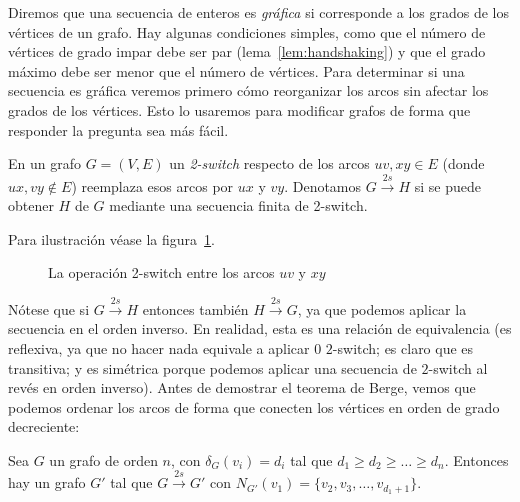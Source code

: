  Diremos que una secuencia de enteros es \emph{gráfica}%
  si corresponde a los grados de los vértices de un grafo.
  Hay algunas condiciones simples,
  como que el número de vértices de grado impar debe ser par
  (lema~\ref{lem:handshaking})
  y que el grado máximo debe ser menor que el número de vértices.
  Para determinar si una secuencia es gráfica
  veremos primero cómo reorganizar los arcos
  sin afectar los grados de los vértices.
  Esto lo usaremos para modificar grafos
  de forma que responder la pregunta sea más fácil.
  \begin{definition}
    En un grafo \(G = (V, E)\)
    un \emph{2\nobreakdash-switch}
    respecto de los arcos \(u v, x y \in E\)
    (donde \(u x, v y \notin E\))
    reemplaza esos arcos por \(u x\) y \(v y\).
    Denotamos \(G \stackrel{2s}{\longrightarrow} H\)
    si se puede obtener \(H\) de \(G\)
    mediante una secuencia finita de 2\nobreakdash-switch.
  \end{definition}
  Para ilustración véase la figura~\ref{fig:2-switch}.
  \begin{figure}[htbp]
    \centering
    \hspace{4em}%
    \caption{La operación 2-switch entre los arcos $u v$ y $x y$}
    \label{fig:2-switch}
  \end{figure}
  Nótese que si \(G \stackrel{2s}{\longrightarrow} H\)
  entonces también \(H \stackrel{2s}{\longrightarrow} G\),
  ya que podemos aplicar la secuencia en el orden inverso.
  En realidad,
  esta es una relación de equivalencia%
  (es reflexiva,
     ya que no hacer nada
     equivale a aplicar \(0\) \(2\)\nobreakdash-switch;
   es claro que es transitiva;
   y es simétrica
     porque podemos aplicar
     una secuencia de \(2\)\nobreakdash-switch
   al revés en orden inverso).
  Antes de demostrar el teorema de Berge,
  vemos que podemos ordenar los arcos
  de forma que conecten los vértices en orden de grado decreciente:
  \begin{lemma}
    \label{lem:Berge}
    Sea \(G\) un grafo de orden \(n\),
    con \(\delta_G(v_i) = d_i\)
    tal que \(d_1 \ge d_2 \ge \dotso \ge d_n\).
    Entonces hay un grafo \(G'\)
    tal que \(G \stackrel{2s}{\longrightarrow} G'\)
    con \(N_{G'} (v_1) = \{v_2, v_3, \dotsc, v_{d_1 + 1}\}\).
  \end{lemma}
